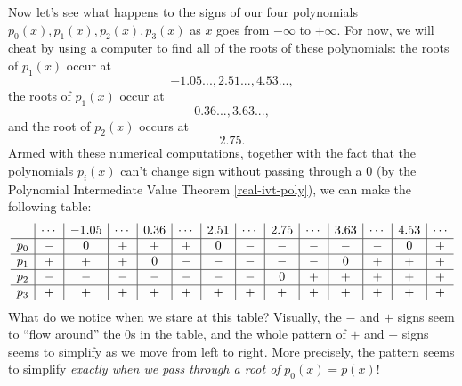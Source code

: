 Now let's see what happens to the signs of our four polynomials $p_0(x), p_1(x), p_2(x), p_3(x)$ as $x$ goes from $-\infty$ to $+\infty$. For now, we will cheat by using a computer to find all of the roots of these polynomials: the roots of $p_1(x)$ occur at
\[
-1.05..., 2.51..., 4.53...,
\]
the roots of $p_1(x)$ occur at
\[
0.36..., 3.63...,
\]
and the root of $p_2(x)$ occurs at
\[
2.75.
\]
Armed with these numerical computations, together with the fact that the polynomials $p_i(x)$ can't change sign without passing through a $0$ (by the Polynomial Intermediate Value Theorem \ref{real-ivt-poly}), we can make the following table:
\[
\begin{array}{c | c | c | c | c | c | c | c | c | c | c | c | c | c}
 & \cdots & -1.05 & \cdots & 0.36 & \cdots & 2.51 & \cdots & 2.75 & \cdots & 3.63 & \cdots & 4.53 & \cdots\\
\hline
p_0 & - & 0 & + & + & + & 0 & - & - & - & - & - & 0 & +\\
\hline
p_1 & + & + & + & 0 & - & - & - & - & - & 0 & + & + & +\\
\hline
p_2 & - & - & - & - & - & - & - & 0 & + & + & + & + & +\\
\hline
p_3 & + & + & + & + & + & + & + & + & + & + & + & + & +
\end{array}
\]
What do we notice when we stare at this table? Visually, the $-$ and $+$ signs seem to ``flow around'' the $0$s in the table, and the whole pattern of $+$ and $-$ signs seems to simplify as we move from left to right. More precisely, the pattern seems to simplify \emph{exactly when we pass through a root of } $p_0(x) = p(x)$!

